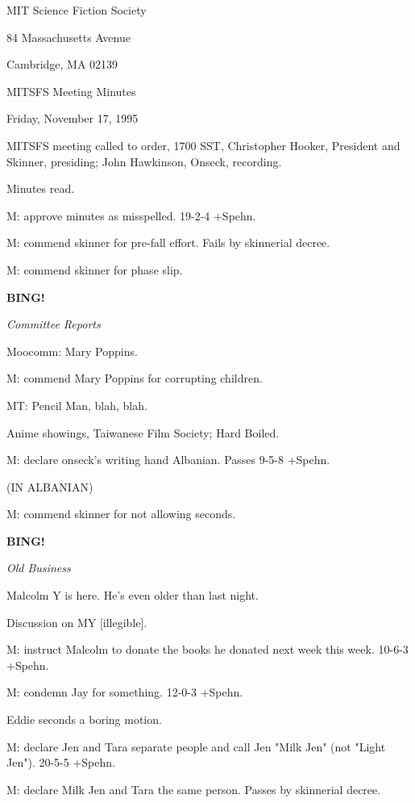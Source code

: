 \documentclass[12pt]{article}
\newcommand{\bing}{{\bf BING!} }
\newcommand{\goto}[1]{\bing \vskip 12pt \centerline{{\em{#1}}}}
\begin{document}
\begin{center}

MIT Science Fiction Society 

84 Massachusetts Avenue

Cambridge, MA 02139

\vspace{12pt}

MITSFS Meeting Minutes 

Friday, November 17, 1995

\end{center}
 
\vspace{18pt}

\setlength{\parskip}{6pt}

\noindent
MITSFS meeting called to order, 1700 SST,
Christopher Hooker, President and Skinner, presiding; John Hawkinson, Onseck, recording.

Minutes read.

M: approve minutes as misspelled. 19-2-4 +Spehn.

M: commend skinner for pre-fall effort. Fails by skinnerial decree.

M: commend skinner for phase slip.

\goto{Committee Reports}

Moocomm: Mary Poppins.

M: commend Mary Poppins for corrupting children.

MT: Pencil Man, blah, blah.

Anime showings, Taiwanese Film Society; Hard Boiled.

M: declare onseck's writing hand Albanian. Passes 9-5-8 +Spehn.

(IN ALBANIAN)

M: commend skinner for not allowing seconds.

\goto{Old Business}

Malcolm Y is here. He's even older than last night.

Discussion on MY [illegible].

M: instruct Malcolm to donate the books he donated next week this week. 10-6-3 +Spehn.

M: condemn Jay for something. 12-0-3 +Spehn.

Eddie seconds a boring motion.

M: declare Jen and Tara separate people and call Jen "Milk Jen" (not "Light Jen"). 20-5-5 +Spehn.

M: declare Milk Jen and Tara the same person. Passes by skinnerial decree.
\end{document}
